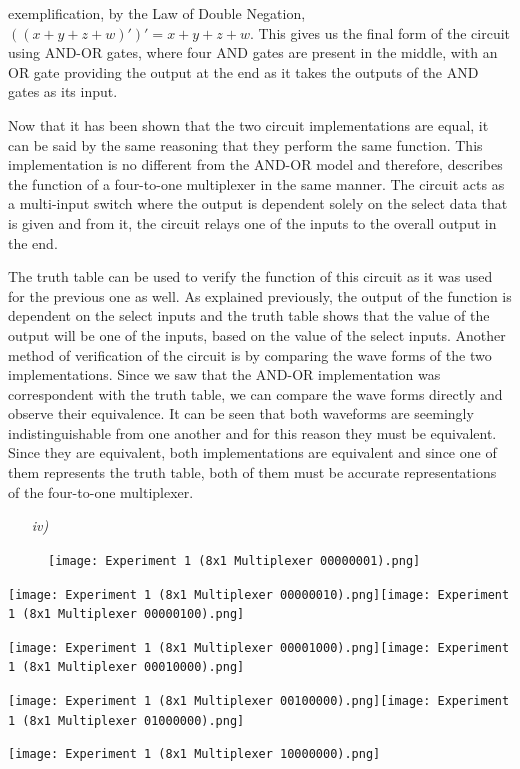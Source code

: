 \documentclass[12pt]{article}
\newcommand{\objects}[2]{%
  \leavevmode\vbox{\hbox{#1}\nointerlineskip\hbox{#2}}%
}
\begin{document}
exemplification, by the Law of Double Negation, $((x+y+z+w)')' = x+y+z+w$. This
gives us the final form of the circuit using AND-OR gates, where four AND gates
are present in the middle, with an OR gate providing the output at the end as it
takes the outputs of the AND gates as its input.
\par Now that it has been shown that the two circuit implementations are equal,
it can be said by the same reasoning that they perform the same function. This
implementation is no different from the AND-OR model and therefore, describes
the function of a four-to-one multiplexer in the same manner. The circuit acts
as a multi-input switch where the output is dependent solely on the select data
that is given and from it, the circuit relays one of the inputs to the overall
output in the end.
\par The truth table can be used to verify the function of this circuit as it
was used for the previous one as well. As explained previously, the output of
the function is dependent on the select inputs and the truth table shows that
the value of the output will be one of the inputs, based on the value of the
select inputs. Another method of verification of the circuit is by comparing the
wave forms of the two implementations. Since we saw that the AND-OR
implementation was correspondent with the truth table, we can compare the wave
forms directly and observe their equivalence. It can be seen that both waveforms
are seemingly indistinguishable from one another and for this reason they must
be equivalent. Since they are equivalent, both implementations are equivalent
and since one of them represents the truth table, both of them must be accurate
representations of the four-to-one multiplexer.
\newpage
\begin{itemize}
    \item[\textit{iv)}]
\end{itemize}
\begin{figure}[h]
    \centering
    \texttt{[image: Experiment 1 (8x1 Multiplexer
    00000001).png]}
\end{figure}
\objects
    {\texttt{[image: Experiment 1 (8x1 Multiplexer
    00000010).png]}}
    {\texttt{[image: Experiment 1 (8x1 Multiplexer
    00000100).png]}}
\objects
    {\texttt{[image: Experiment 1 (8x1 Multiplexer
    00001000).png]}}
    {\texttt{[image: Experiment 1 (8x1 Multiplexer
    00010000).png]}}
\begin{center}
    \objects
        {\texttt{[image: Experiment 1 (8x1 Multiplexer
        00100000).png]}}
        {\texttt{[image: Experiment 1 (8x1 Multiplexer
        01000000).png]}}
        {\texttt{[image: Experiment 1 (8x1 Multiplexer
        10000000).png]}}
\end{center}
\end{document}

